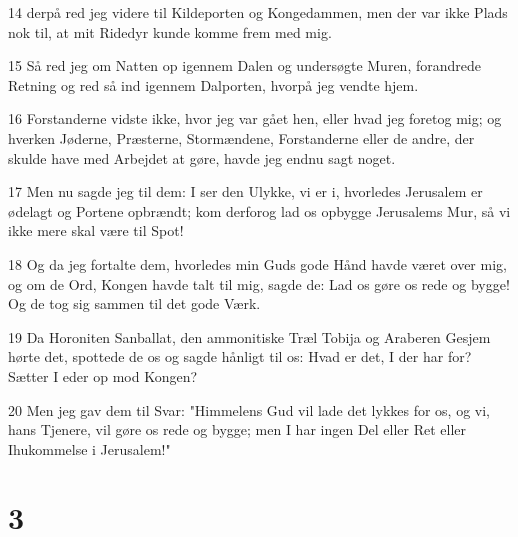 \par 14 derpå red jeg videre til Kildeporten og Kongedammen, men der var ikke Plads nok til, at mit Ridedyr kunde komme frem med mig.
\par 15 Så red jeg om Natten op igennem Dalen og undersøgte Muren, forandrede Retning og red så ind igennem Dalporten, hvorpå jeg vendte hjem.
\par 16 Forstanderne vidste ikke, hvor jeg var gået hen, eller hvad jeg foretog mig; og hverken Jøderne, Præsterne, Stormændene, Forstanderne eller de andre, der skulde have med Arbejdet at gøre, havde jeg endnu sagt noget.
\par 17 Men nu sagde jeg til dem: I ser den Ulykke, vi er i, hvorledes Jerusalem er ødelagt og Portene opbrændt; kom derforog lad os opbygge Jerusalems Mur, så vi ikke mere skal være til Spot!
\par 18 Og da jeg fortalte dem, hvorledes min Guds gode Hånd havde været over mig, og om de Ord, Kongen havde talt til mig, sagde de: Lad os gøre os rede og bygge! Og de tog sig sammen til det gode Værk.
\par 19 Da Horoniten Sanballat, den ammonitiske Træl Tobija og Araberen Gesjem hørte det, spottede de os og sagde hånligt til os: Hvad er det, I der har for? Sætter I eder op mod Kongen?
\par 20 Men jeg gav dem til Svar: "Himmelens Gud vil lade det lykkes for os, og vi, hans Tjenere, vil gøre os rede og bygge; men I har ingen Del eller Ret eller Ihukommelse i Jerusalem!"

\chapter{3}

